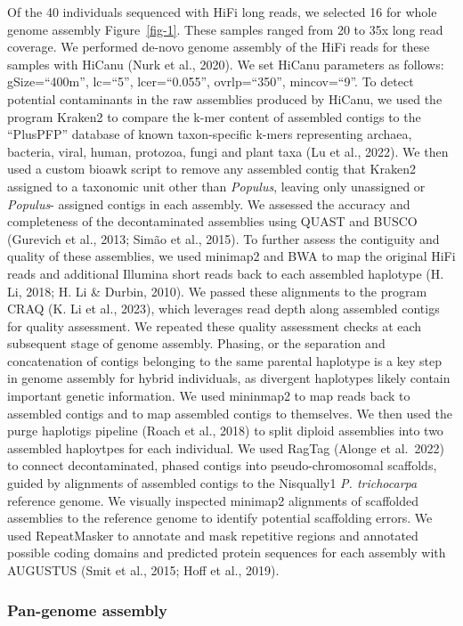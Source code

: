 \documentclass[
]{agujournal2019}
\begin{document}
Of the 40 individuals sequenced with HiFi long reads, we selected 16 for
whole genome assembly Figure~\ref{fig-1}. These samples ranged from 20
to 35x long read coverage. We performed de-novo genome assembly of the
HiFi reads for these samples with HiCanu (Nurk et al., 2020). We set
HiCanu parameters as follows: gSize=``400m'', lc=``5'', lcer=``0.055'',
ovrlp=``350'', mincov=``9''. To detect potential contaminants in the raw
assemblies produced by HiCanu, we used the program Kraken2 to compare
the k-mer content of assembled contigs to the ``PlusPFP'' database of
known taxon-specific k-mers representing archaea, bacteria, viral,
human, protozoa, fungi and plant taxa (Lu et al., 2022). We then used a
custom bioawk script to remove any assembled contig that Kraken2
assigned to a taxonomic unit other than \emph{Populus}, leaving only
unassigned or \emph{Populus}- assigned contigs in each assembly. We
assessed the accuracy and completeness of the decontaminated assemblies
using QUAST and BUSCO (Gurevich et al., 2013; Simão et al., 2015). To
further assess the contiguity and quality of these assemblies, we used
minimap2 and BWA to map the original HiFi reads and additional Illumina
short reads back to each assembled haplotype (H. Li, 2018; H. Li \&
Durbin, 2010). We passed these alignments to the program CRAQ (K. Li et
al., 2023), which leverages read depth along assembled contigs for
quality assessment. We repeated these quality assessment checks at each
subsequent stage of genome assembly. Phasing, or the separation and
concatenation of contigs belonging to the same parental haplotype is a
key step in genome assembly for hybrid individuals, as divergent
haplotypes likely contain important genetic information. We used
mininmap2 to map reads back to assembled contigs and to map assembled
contigs to themselves. We then used the purge haplotigs pipeline (Roach
et al., 2018) to split diploid assemblies into two assembled haploytpes
for each individual. We used RagTag (Alonge et al.~2022) to connect
decontaminated, phased contigs into pseudo-chromosomal scaffolds, guided
by alignments of assembled contigs to the Nisqually1 \emph{P.
trichocarpa} reference genome. We visually inspected minimap2 alignments
of scaffolded assemblies to the reference genome to identify potential
scaffolding errors. We used RepeatMasker to annotate and mask repetitive
regions and annotated possible coding domains and predicted protein
sequences for each assembly with AUGUSTUS (Smit et al., 2015; Hoff et
al., 2019).

\subsubsection{Pan-genome assembly}\label{pan-genome-assembly}
\end{document}
